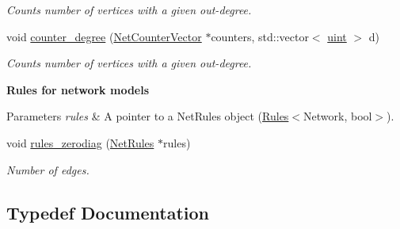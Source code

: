 \begin{Indent}
\begin{DoxyCompactItemize}
\begin{DoxyCompactList}\small\item\em Counts number of vertices with a given out-\/degree. \end{DoxyCompactList}\item 
void \hyperlink{namespacebarry_1_1counters_1_1network_a8c7ef19041094ac55a17106940c7d244}{counter\+\_\+degree} (\hyperlink{namespacebarry_1_1counters_1_1network_a3b3c590303d47840d1967372ae495d95}{Net\+Counter\+Vector} $\ast$counters, std\+::vector$<$ \hyperlink{namespacebarry_a11dfc53ddb4672278319aa04f1e09a6c}{uint} $>$ d)
\begin{DoxyCompactList}\small\item\em Counts number of vertices with a given out-\/degree. \end{DoxyCompactList}\end{DoxyCompactItemize}
\end{Indent}
\begin{Indent}\textbf{ Rules for network models}\par
{\em 
\begin{DoxyParams}{Parameters}
{\em rules} & A pointer to a {\ttfamily Net\+Rules} object ({\ttfamily \hyperlink{classbarry_1_1_rules}{Rules}}$<${\ttfamily Network}, {\ttfamily bool}$>$). \\
\hline
\end{DoxyParams}
}\begin{DoxyCompactItemize}
\item 
void \hyperlink{namespacebarry_1_1counters_1_1network_a19680c70c20a093a84b6cc71a2597510}{rules\+\_\+zerodiag} (\hyperlink{namespacebarry_1_1counters_1_1network_adbdb20b3ce883777da2364984ea10c56}{Net\+Rules} $\ast$rules)
\begin{DoxyCompactList}\small\item\em Number of edges. \end{DoxyCompactList}\end{DoxyCompactItemize}
\end{Indent}


\subsection{Typedef Documentation}
\mbox{\label{namespacebarry_1_1counters_1_1network_a067bd9de04608fc2e1586324d3864a45}} 
